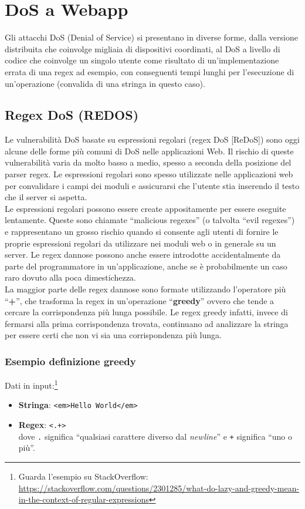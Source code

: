 \chapter{DoS a Webapp}

Gli attacchi DoS (Denial of Service) si presentano in diverse forme, dalla versione distribuita che coinvolge migliaia di dispositivi coordinati, al DoS a livello di codice che coinvolge un singolo utente come risultato di un'implementazione errata di una regex ad esempio, con conseguenti tempi lunghi per l'esecuzione di un'operazione (convalida di una stringa in questo caso).

\section{Regex DoS (REDOS)}
Le vulnerabilità DoS basate su espressioni regolari (regex DoS [ReDoS]) sono oggi alcune delle forme più comuni di DoS nelle applicazioni Web. Il rischio di queste vulnerabilità varia da molto basso a medio, spesso a seconda della posizione del parser regex. Le espressioni regolari sono spesso utilizzate nelle applicazioni web per convalidare i campi dei moduli e assicurarsi che l'utente stia inserendo il testo che il server si aspetta.\\

Le espressioni regolari possono essere create appositamente per essere eseguite lentamente. Queste sono chiamate ``malicious regexes'' (o talvolta ``evil regexes'') e rappresentano un grosso rischio quando si consente agli utenti di fornire le proprie espressioni regolari da utilizzare nei moduli web o in generale su un server. Le regex dannose possono anche essere introdotte accidentalmente da parte del programmatore in un'applicazione, anche se è probabilmente un caso raro dovuto alla poca dimestichezza.\\

La maggior parte delle regex dannose sono formate utilizzando l'operatore più ``\textbf{+}'', che trasforma la regex in un'operazione ``\textbf{greedy}'' ovvero che tende a cercare la corrispondenza più lunga possibile. Le regex greedy infatti, invece di fermarsi alla prima corrispondenza trovata, continuano ad analizzare la stringa per essere certi che non vi sia una corrispondenza più lunga.

\subsection{Esempio definizione greedy}
Dati in input:\footnote{Guarda l'esempio su StackOverflow: \url{https://stackoverflow.com/questions/2301285/what-do-lazy-and-greedy-mean-in-the-context-of-regular-expressions}}
\begin{itemize}
	\item \textbf{Stringa}: \verb|<em>Hello World</em>|
	\item \textbf{Regex}: \verb|<.+>|\\
	      dove \verb|.| significa ``qualsiasi carattere diverso dal \emph{newline}'' e \verb|+| significa ``uno o più''. 
\end{itemize}

